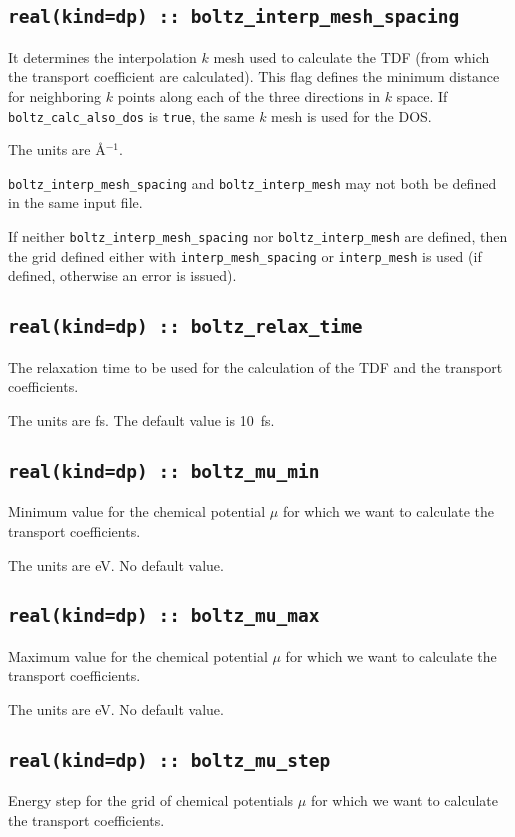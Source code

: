 \subsection[boltz\_interp\_mesh\_spacing]{\tt real(kind=dp) :: boltz\_interp\_mesh\_spacing}
It determines the interpolation $k$ mesh used to calculate the TDF (from which the transport coefficient are calculated). This flag defines the minimum distance for neighboring $k$ points along each of the three directions in $k$ space. If {\tt boltz\_calc\_also\_dos} is \verb#true#, the same $k$ mesh is used for the DOS.

The units are \AA$^{-1}$.

{\tt boltz\_interp\_mesh\_spacing} and  {\tt boltz\_interp\_mesh} may not both be defined in the same input file.

If neither {\tt boltz\_interp\_mesh\_spacing} nor  {\tt boltz\_interp\_mesh} are defined, then the grid defined either with {\tt interp\_mesh\_spacing} or {\tt interp\_mesh} is used (if defined, otherwise an error is issued).

\subsection[boltz\_relax\_time]{\tt real(kind=dp) :: boltz\_relax\_time}
The relaxation time to be used for the calculation of the TDF and the transport coefficients.

The units are fs.
The default value is 10~fs.

\subsection[boltz\_mu\_min]{\tt real(kind=dp) :: boltz\_mu\_min}
Minimum value for the chemical potential $\mu$ for which we want to calculate the transport coefficients.

The units are eV.
No default value.

\subsection[boltz\_mu\_max]{\tt real(kind=dp) :: boltz\_mu\_max}
Maximum value for the chemical potential $\mu$ for which we want to calculate the transport coefficients.

The units are eV.
No default value.

\subsection[boltz\_mu\_step]{\tt real(kind=dp) :: boltz\_mu\_step}
Energy step for the grid of chemical potentials $\mu$ for which we want to calculate the transport coefficients.


